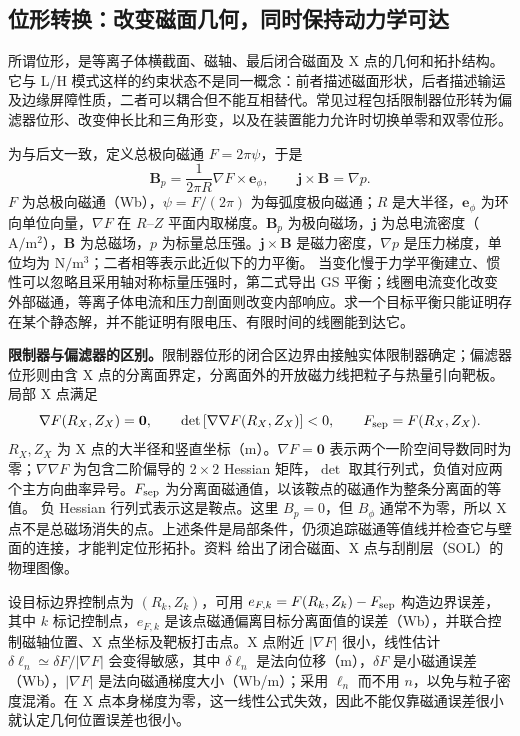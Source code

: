 \documentclass[12pt,fontset=none]{ctexart}
\numberwithin{equation}{section}
\numberwithin{table}{section}
\numberwithin{figure}{section}
\begin{document}
\subsection{位形转换：改变磁面几何，同时保持动力学可达}\label{sec:cycle-shape}

所谓位形，是等离子体横截面、磁轴、最后闭合磁面及 X 点的几何和拓扑结构。它与 L/H 模式这样的约束状态不是同一概念：前者描述磁面形状，后者描述输运及边缘屏障性质，二者可以耦合但不能互相替代。常见过程包括限制器位形转为偏滤器位形、改变伸长比和三角形变，以及在装置能力允许时切换单零和双零位形。

为与后文一致，定义总极向磁通 $F=2\pi\psi$，于是
\begin{equation}\label{eq:cycle-flux}
 \bm B_p=\frac{1}{2\pi R}\nabla F\times\bm e_\phi,
 \qquad \bm j\times\bm B=\nabla p.
\end{equation}
$F$ 为总极向磁通（Wb），$\psi=F/(2\pi)$ 为每弧度极向磁通；$R$ 是大半径，$\bm e_\phi$ 为环向单位向量，$\nabla F$ 在 $R$--$Z$ 平面内取梯度。$\bm B_p$ 为极向磁场，$\bm j$ 为总电流密度（$\mathrm{A/m^2}$），$\bm B$ 为总磁场，$p$ 为标量总压强。$\bm j\times\bm B$ 是磁力密度，$\nabla p$ 是压力梯度，单位均为 $\mathrm{N/m^3}$；二者相等表示此近似下的力平衡。
当变化慢于力学平衡建立、惯性可以忽略且采用轴对称标量压强时，第二式导出 GS 平衡；线圈电流变化改变外部磁通，等离子体电流和压力剖面则改变内部响应。求一个目标平衡只能证明存在某个静态解，并不能证明有限电压、有限时间的线圈能到达它。

\textbf{限制器与偏滤器的区别。}限制器位形的闭合区边界由接触实体限制器确定；偏滤器位形则由含 X 点的分离面界定，分离面外的开放磁力线把粒子与热量引向靶板。局部 X 点满足
\begin{equation}\label{eq:cycle-xpoint}
 \nabla F(R_X,Z_X)=\bm0,
 \qquad \det\left[\nabla\nabla F(R_X,Z_X)\right]<0,
 \qquad F_{\rm sep}=F(R_X,Z_X).
\end{equation}
$R_X,Z_X$ 为 X 点的大半径和竖直坐标（m）。$\nabla F=\bm0$ 表示两个一阶空间导数同时为零；$\nabla\nabla F$ 为包含二阶偏导的 $2\times2$ Hessian 矩阵，$\det$ 取其行列式，负值对应两个主方向曲率异号。$F_{\rm sep}$ 为分离面磁通值，以该鞍点的磁通作为整条分离面的等值。
负 Hessian 行列式表示这是鞍点。这里 $B_p=0$，但 $B_\phi$ 通常不为零，所以 X 点不是总磁场消失的点。上述条件是局部条件，仍须追踪磁通等值线并检查它与壁面的连接，才能判定位形拓扑。资料 \cite{C6} 给出了闭合磁面、X 点与刮削层（SOL）的物理图像。

设目标边界控制点为 $(R_k,Z_k)$，可用 $e_{F,k}=F(R_k,Z_k)-F_{\rm sep}$ 构造边界误差，其中 $k$ 标记控制点，$e_{F,k}$ 是该点磁通偏离目标分离面值的误差（Wb），并联合控制磁轴位置、X 点坐标及靶板打击点。X 点附近 $|\nabla F|$ 很小，线性估计 $\delta\ell_n\simeq\delta F/|\nabla F|$ 会变得敏感，其中 $\delta\ell_n$ 是法向位移（m），$\delta F$ 是小磁通误差（Wb），$|\nabla F|$ 是法向磁通梯度大小（Wb/m）；采用 $\ell_n$ 而不用 $n$，以免与粒子密度混淆。在 X 点本身梯度为零，这一线性公式失效，因此不能仅靠磁通误差很小就认定几何位置误差也很小。
\end{document}
